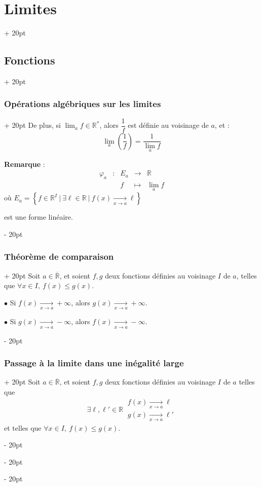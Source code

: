 \documentclass[a4paper, 12pt, twoside]{article}
\newcommand{\R}{\mathbb{R}} %
\newcommand{\cj}[1]{\overline{#1}} %
\newcommand{\tendsto}[1]{\xrightarrow[#1]{}}
\newcommand{\lr}[1]{\left( #1 \right)}
\newcommand{\set}[1]{\left\{ #1 \right\}}
\renewcommand{\le}{\leqslant}
\newcommand{\ind}[1][20pt]{\advance\leftskip + #1}
\newcommand{\deind}[1][20pt]{\advance\leftskip - #1}
\newenvironment{indt}[2][20pt]{#2 \par \ind[#1]}{\par \deind} %
\begin{document}
\begin{indt}{\section{Limites}}
\begin{indt}{\subsection{Fonctions}}
\begin{indt}{\subsubsection{Opérations algébriques sur les limites}}
                De plus, si $\displaystyle \lim_a f \in \R^*$, alors $\dfrac 1 f$ est définie au voisinage de $a$, et :
                \[
                    \lim_a\!\lr{\dfrac 1 f} = \dfrac{1}{\lim_a f}
                \]

                \vspace{12pt}
                
                \textbf{Remarque} :
                \[
                    \begin{array}{ccccc}
                        \varphi_a & : & E_a & \longrightarrow & \R
                        \\
                        && f & \longmapsto & \displaystyle \lim_a f
                    \end{array}
                \]
                où $E_a = \set{f \in \R^I\ |\ \exists \ell \in \R\ |\ f(x) \tendsto{x \to a} \ell}$

                est une forme linéaire.
            \end{indt}

            \vspace{12pt}
            
            \begin{indt}{\subsubsection{Théorème de comparaison}}
                Soit $a \in \cj \R$, et soient $f, g$ deux fonctions définies au voisinage $I$ de $a$, telles que $\forall x \in I,\ f(x) \le g(x)$.

                \vspace{6pt}
                
                $\bullet$ Si $f(x) \tendsto{x \to a} +\infty$, alors $g(x) \tendsto{x \to a} +\infty$.

                $\bullet$ Si $g(x) \tendsto{x \to a} -\infty$, alors $f(x) \tendsto{x \to a} -\infty$.
            \end{indt}

            \vspace{12pt}
            
            \begin{indt}{\subsubsection{Passage à la limite dans une inégalité large}}
                Soit $a \in \cj \R$, et soient $f, g$ deux fonctions définies au voisinage $I$ de $a$ telles que
                \[
                    \exists \ell, \ell' \in \R\
                    \begin{array}{|l}
                        f(x) \tendsto{x \to a} \ell
                        \\
                        g(x) \tendsto{x \to a} \ell'
                    \end{array}
                \]
                et telles que $\forall x \in I,\ f(x) \le g(x)$.


\end{indt}
\end{indt}
\end{indt}
\end{document}
